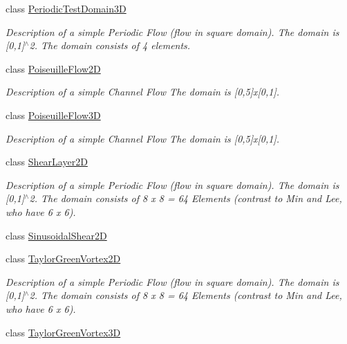 \begin{DoxyCompactItemize}
class \hyperlink{classnatrium_1_1PeriodicTestDomain3D}{PeriodicTestDomain3D}
\begin{DoxyCompactList}\small\item\em Description of a simple Periodic Flow (flow in square domain). The domain is \mbox{[}0,1\mbox{]}$^\wedge$2. The domain consists of 4 elements. \item\end{DoxyCompactList}\item 
class \hyperlink{classnatrium_1_1PoiseuilleFlow2D}{PoiseuilleFlow2D}
\begin{DoxyCompactList}\small\item\em Description of a simple Channel Flow The domain is \mbox{[}0,5\mbox{]}x\mbox{[}0,1\mbox{]}. \item\end{DoxyCompactList}\item 
class \hyperlink{classnatrium_1_1PoiseuilleFlow3D}{PoiseuilleFlow3D}
\begin{DoxyCompactList}\small\item\em Description of a simple Channel Flow The domain is \mbox{[}0,5\mbox{]}x\mbox{[}0,1\mbox{]}. \item\end{DoxyCompactList}\item 
class \hyperlink{classnatrium_1_1ShearLayer2D}{ShearLayer2D}
\begin{DoxyCompactList}\small\item\em Description of a simple Periodic Flow (flow in square domain). The domain is \mbox{[}0,1\mbox{]}$^\wedge$2. The domain consists of 8 x 8 = 64 Elements (contrast to Min and Lee, who have 6 x 6). \item\end{DoxyCompactList}\item 
class \hyperlink{classnatrium_1_1SinusoidalShear2D}{SinusoidalShear2D}
\item 
class \hyperlink{classnatrium_1_1TaylorGreenVortex2D}{TaylorGreenVortex2D}
\begin{DoxyCompactList}\small\item\em Description of a simple Periodic Flow (flow in square domain). The domain is \mbox{[}0,1\mbox{]}$^\wedge$2. The domain consists of 8 x 8 = 64 Elements (contrast to Min and Lee, who have 6 x 6). \item\end{DoxyCompactList}\item 
class \hyperlink{classnatrium_1_1TaylorGreenVortex3D}{TaylorGreenVortex3D}

\end{DoxyCompactItemize}
